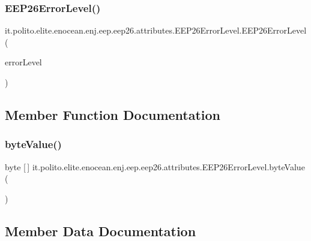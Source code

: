 \subsubsection{\texorpdfstring{E\+E\+P26\+Error\+Level()}{EEP26ErrorLevel()}\hspace{0.1cm}{\footnotesize\ttfamily [2/2]}}
{\footnotesize\ttfamily it.\+polito.\+elite.\+enocean.\+enj.\+eep.\+eep26.\+attributes.\+E\+E\+P26\+Error\+Level.\+E\+E\+P26\+Error\+Level (\begin{DoxyParamCaption}\item[{\hyperlink{enumit_1_1polito_1_1elite_1_1enocean_1_1enj_1_1eep_1_1eep26_1_1_d2_1_1_d201_1_1_d201_error_level}{D201\+Error\+Level}}]{error\+Level }\end{DoxyParamCaption})}



\subsection{Member Function Documentation}
\hypertarget{classit_1_1polito_1_1elite_1_1enocean_1_1enj_1_1eep_1_1eep26_1_1attributes_1_1_e_e_p26_error_level_a9d46c5cf3b1a984dc364e180291fb8fa}{}\label{classit_1_1polito_1_1elite_1_1enocean_1_1enj_1_1eep_1_1eep26_1_1attributes_1_1_e_e_p26_error_level_a9d46c5cf3b1a984dc364e180291fb8fa} 
\subsubsection{\texorpdfstring{byte\+Value()}{byteValue()}}
{\footnotesize\ttfamily byte \mbox{[}$\,$\mbox{]} it.\+polito.\+elite.\+enocean.\+enj.\+eep.\+eep26.\+attributes.\+E\+E\+P26\+Error\+Level.\+byte\+Value (\begin{DoxyParamCaption}{ }\end{DoxyParamCaption})}



\subsection{Member Data Documentation}
\hypertarget{classit_1_1polito_1_1elite_1_1enocean_1_1enj_1_1eep_1_1eep26_1_1attributes_1_1_e_e_p26_error_level_a6de549ae67f2879b648876d1d26d4861}{}\label{classit_1_1polito_1_1elite_1_1enocean_1_1enj_1_1eep_1_1eep26_1_1attributes_1_1_e_e_p26_error_level_a6de549ae67f2879b648876d1d26d4861} 
